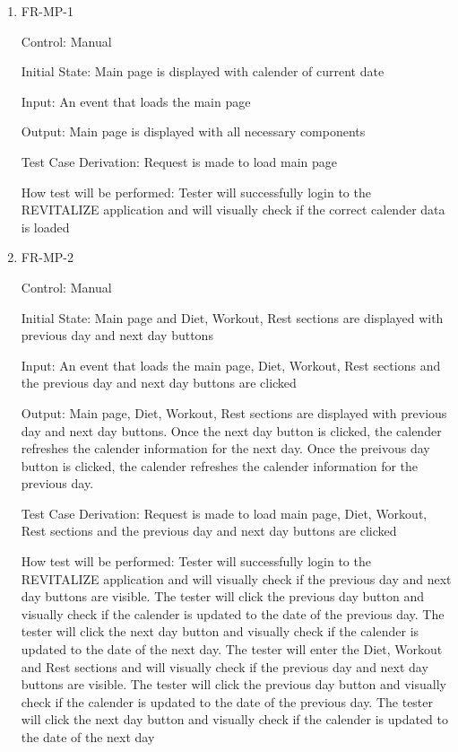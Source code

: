 \documentclass[12pt, titlepage]{article}
\begin{document}
\begin{enumerate}

\item{FR-MP-1\\}

Control: Manual
					
Initial State: Main page is displayed with calender of current date
					
Input: An event that loads the main page
					
Output: Main page is displayed with all necessary components

Test Case Derivation: Request is made to load main page

How test will be performed: Tester will successfully login to the REVITALIZE application and will visually check if the correct calender data is loaded
					
\item{FR-MP-2\\}

Control: Manual
					
Initial State: Main page and Diet, Workout, Rest sections are displayed with previous day and next day buttons
					
Input: An event that loads the main page, Diet, Workout, Rest sections and the previous day and next day  buttons are clicked
					
Output: Main page, Diet, Workout, Rest sections are displayed with previous day and next day buttons. Once the next day button is clicked, the calender refreshes  the calender information for the next day. Once the preivous day button is clicked, the calender refreshes the calender information for the previous day.

Test Case Derivation: Request is made to load main page, Diet, Workout, Rest sections and the previous day and next day buttons are clicked

How test will be performed: Tester will successfully login to the REVITALIZE application and will visually check if the previous day and next day buttons are visible. The tester will click the previous day button and visually check if the calender is updated to the date of the previous day. The tester will click the next day button and visually check if the calender is updated to the date of the next day. The tester will enter the Diet, Workout and Rest sections and will visually check if the previous day and next day buttons are visible. The tester will click the previous day button and visually check if the calender is updated to the date of the previous day. The tester will click the next day button and visually check if the calender is updated to the date of the next day


\end{enumerate}
\end{document}
